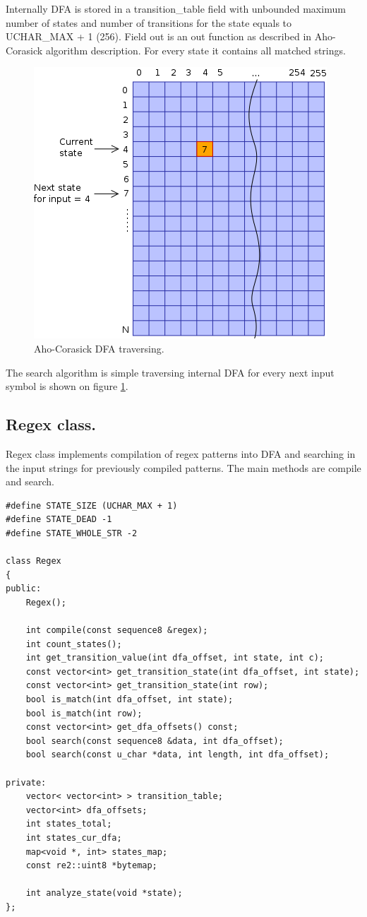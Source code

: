 \documentclass[thesis=M,english]{FITthesis}[2011/07/15]
\begin{document}
Internally DFA is stored in a transition\_table field with unbounded maximum number of states and number of transitions for the state equals to UCHAR\_MAX + 1 (256). Field out is an out function as described in Aho-Corasick algorithm description. For every state it contains all matched strings.

\begin{figure}[h]
\centering
\includegraphics[scale=0.5]{images/ac_grid.png}
\caption{Aho-Corasick DFA traversing.}
\label{fig:ac_grid}
\end{figure}

The search algorithm is simple traversing internal DFA for every next input symbol is shown on figure \ref{fig:ac_grid}.

\subsection{Regex class.}
Regex class implements compilation of regex patterns into DFA and searching in the input strings for previously compiled patterns. The main methods are compile and search. 

\begin{lstlisting}
#define STATE_SIZE (UCHAR_MAX + 1)
#define STATE_DEAD -1
#define STATE_WHOLE_STR -2

class Regex
{
public:
    Regex();

    int compile(const sequence8 &regex);
    int count_states();
    int get_transition_value(int dfa_offset, int state, int c);
    const vector<int> get_transition_state(int dfa_offset, int state);
    const vector<int> get_transition_state(int row);
    bool is_match(int dfa_offset, int state);
    bool is_match(int row);
    const vector<int> get_dfa_offsets() const;
    bool search(const sequence8 &data, int dfa_offset);
    bool search(const u_char *data, int length, int dfa_offset);

private:
    vector< vector<int> > transition_table;
    vector<int> dfa_offsets;
    int states_total;
    int states_cur_dfa;
    map<void *, int> states_map;
    const re2::uint8 *bytemap;

    int analyze_state(void *state);
};
\end{lstlisting}
\end{document}

